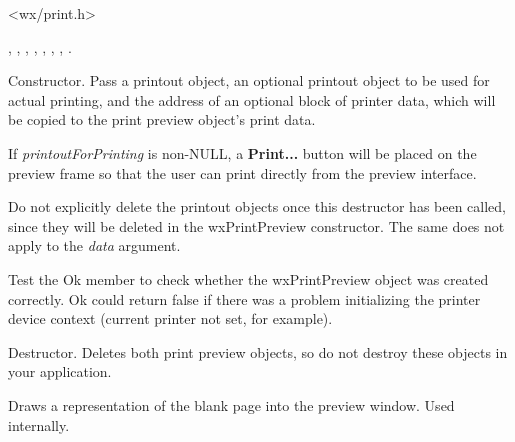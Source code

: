 


<wx/print.h>


, , ,\rtfsp
{}, ,\rtfsp
{}, ,\rtfsp
{}.




Constructor. Pass a printout object, an optional printout object to be
used for actual printing, and the address of an optional
block of printer data, which will be copied to the print preview object's
print data.

If {\it printoutForPrinting} is non-NULL, a {\bf Print...} button will be placed on the
preview frame so that the user can print directly from the preview interface.

Do not explicitly delete the printout objects once this destructor has been
called, since they will be deleted in the wxPrintPreview constructor.
The same does not apply to the {\it data} argument.

Test the Ok member to check whether the wxPrintPreview object was created correctly.
Ok could return false if there was a problem initializing the printer device context
(current printer not set, for example).



Destructor. Deletes both print preview objects, so do not destroy these objects
in your application.

\label{wxprintpreviewdrawblankpage}


Draws a representation of the blank page into the preview window. Used
internally.

